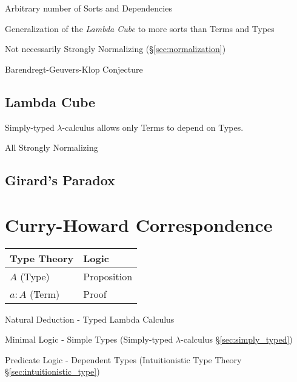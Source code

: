 Arbitrary number of Sorts and Dependencies

Generalization of the \emph{Lambda Cube} to more sorts than Terms and
Types

Not necessarily Strongly Normalizing (\S\ref{sec:normalization})

Barendregt-Geuvers-Klop Conjecture



\subsection{Lambda Cube}\label{sec:lambda_cube}

Simply-typed $\lambda$-calculus allows only Terms to depend on Types.

All Strongly Normalizing



\subsection{Girard's Paradox}\label{sec:girards_paradox}



\section{Curry-Howard Correspondence}\label{sec:curry_howard}

\begin{tabular}{| l | l |}
\hline
\textbf{Type Theory} & \textbf{Logic} \\ \hline \hline
$A$ (Type) & Proposition \\ \hline
$a : A$ (Term) & Proof \\
\hline
\end{tabular}

Natural Deduction - Typed Lambda Calculus

Minimal Logic - Simple Types (Simply-typed $\lambda$-calculus
\S\ref{sec:simply_typed})

Predicate Logic - Dependent Types (Intuitionistic Type Theory
\S\ref{sec:intuitionistic_type})

